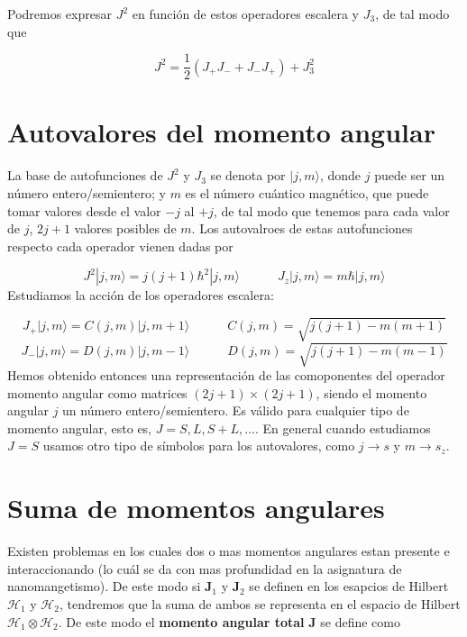 \documentclass[12pt,a4paper]{book}
\numberwithin{equation}{chapter}
\numberwithin{figure}{chapter}
\newcommand{\tquad}{\quad \quad \quad}
\newcommand{\parentesis}[1]{\left( #1  \right)}
\newcommand{\Hcal}{\mathcal{H}}
\newcommand{\Jn}{\mathbf{J}}
\begin{document}
Podremos expresar $J^2$ en función de estos operadores escalera y $J_3$, de tal modo que

\begin{equation}
J^2 = \frac{1}{2} \parentesis{J_+J_- + J_-J_+} + J_3^2
\end{equation}

\section{Autovalores del momento angular}

La base de autofunciones de $J^2$ y $J_3$ se denota por $|j,m\rangle$, donde $j$ puede ser un número entero/semientero; y $m$ es el número cuántico magnético, que puede tomar valores desde el valor $-j$ al $+j$, de tal modo que tenemos para cada valor de $j$, $2j+1$ valores posibles de $m$. Los autovalroes de estas autofunciones respecto cada operador vienen dadas por

\begin{equation}
J^2 |j,m\rangle =  j (j+1)\hbar^2 |j,m\rangle \tquad J_z |j,m\rangle = m \hbar |j,m\rangle
\end{equation}
Estudiamos la acción de los operadores escalera:

\begin{equation}
J_+ |j,m\rangle = C(j,m) |j,m+1\rangle  \tquad C(j,m) = \sqrt{j(j+1)-m(m+1)}
\end{equation}
\begin{equation}
J_- |j,m\rangle = D(j,m) |j,m-1\rangle  \tquad D(j,m) = \sqrt{j(j+1)-m(m-1)}
\end{equation}
Hemos obtenido entonces una representación de las comoponentes del operador momento angular como matrices $(2j+1)\times(2j+1)$, siendo el momento angular $j$ un número entero/semientero. Es válido para cualquier tipo de momento angular, esto es, $J=S,L,S+L,...$. En general cuando estudiamos $J=S$ usamos otro tipo de símbolos para los autovalores, como $j\rightarrow s$ y $m\rightarrow s_z$.

\section{Suma de momentos angulares}

Existen problemas en los cuales dos o mas momentos angulares estan presente e interaccionando (lo cuál se da con mas profundidad en la asignatura de nanomangetismo). De este modo si $\Jn_1$ y $\Jn_2$ se definen en los esapcios de Hilbert $\Hcal_1$ y $\Hcal_2$, tendremos que la suma de ambos se representa en el espacio de Hilbert $\Hcal_1 \otimes \Hcal_2$. De este modo el \textbf{momento angular total} $\Jn$ se define como 
\end{document}
